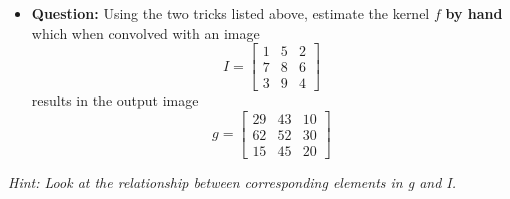 \hspace{6pt}
\begin{itemize}
\item \textbf{Question:} Using the two tricks listed above, estimate the kernel $f$ \textbf{by hand} which when convolved with an image 
\begin{equation}
I = 
	\begin{bmatrix}
    		     1 & 5 & 2 \\
    		     7 & 8 & 6 \\
    		     3 & 9 & 4 
	   		   \end{bmatrix}
\end{equation}
results in the output image
\begin{equation}
g = 
	\begin{bmatrix}
    		     29 & 43 & 10 \\
    		     62 & 52 & 30 \\
    		     15 & 45 & 20 
	   		   \end{bmatrix}
\end{equation}
\end{itemize}
\textit{Hint: Look at the relationship between corresponding elements in g and I.}



